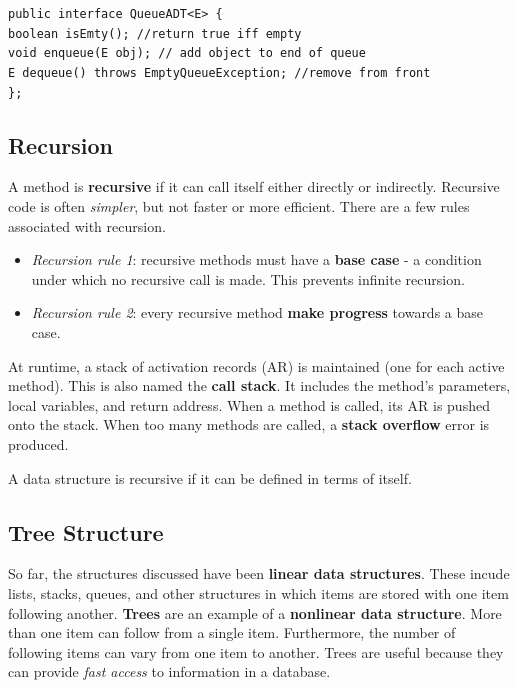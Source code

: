 \texttt{public interface QueueADT<E> \{} \\
\indent \indent \texttt{boolean isEmty(); //return true iff empty} \\
\indent \indent \texttt{void enqueue(E obj); // add object to end of queue} \\
\indent \indent \texttt{E dequeue() throws EmptyQueueException; //remove from front} \\
\indent \texttt{\};} \\

\subsection{Recursion}

A method is \textbf{recursive} if it can call itself either directly or indirectly. Recursive code is often \textit{simpler}, but not faster or more efficient. There are a few rules associated with recursion. 

\begin{itemize}
	\item \textit{Recursion rule 1}: recursive methods must have a \textbf{base case} - a condition under which no recursive call is made. This prevents infinite recursion. 
	\item \textit{Recursion rule 2}: every recursive method \textbf{make progress} towards a base case. 
\end{itemize}

At runtime, a stack of activation records (AR) is maintained (one for each active method). This is also named the \textbf{call stack}. It includes the method's parameters, local variables, and return address. When a method is called, its AR is pushed onto the stack. When too many methods are called, a \textbf{stack overflow} error is produced. 

A data structure is recursive if it can be defined in terms of itself. 


\subsection{Tree Structure}

So far, the structures discussed have been \textbf{linear data structures}. These incude lists, stacks, queues, and other structures in which items are stored with one item following another. \textbf{Trees} are an example of a \textbf{nonlinear data structure}. More than one item can follow from a single item. Furthermore, the number of following items can vary from one item to another. Trees are useful because they can provide \textit{fast access} to information in a database. 

